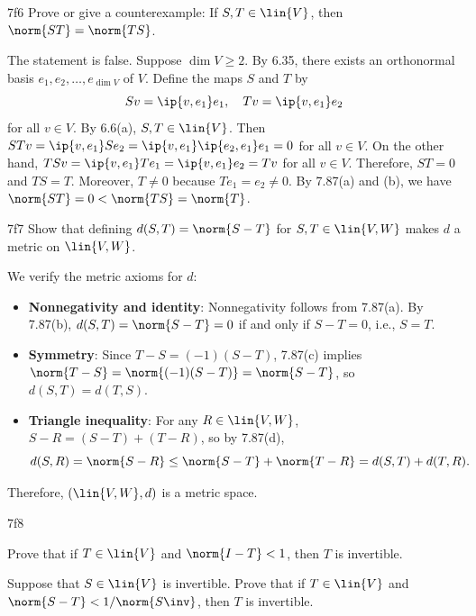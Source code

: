 \begin{exercise}{7f6}
    Prove or give a counterexample: If $S, T \in \lin{V}$, then $\norm{ST} = \norm{TS}$.
\end{exercise}

\begin{sol}
    The statement is false.
    Suppose $\dim V \geq 2$.
    By 6.35, there exists an orthonormal basis $e_1, e_2, \dots, e_{\dim V}$ of $V$.
    Define the maps $S$ and $T$ by
    \[
        S v = \ip{v, e_1} e_1, \quad T v = \ip{v, e_1} e_2
    \]
    for all $v \in V$.
    By 6.6(a), $S, T \in \lin{V}$.
    Then $ST v = \ip{v, e_1} S e_2 = \ip{v, e_1} \ip{e_2, e_1} e_1 = 0$ for all $v \in V$.
    On the other hand, $TS v = \ip{v, e_1} T e_1 = \ip{v, e_1} e_2 = T v$ for all $v \in V$.
    Therefore, $ST = 0$ and $TS = T$.
    Moreover, $T \neq 0$ because $T e_1 = e_2 \neq 0$.
    By 7.87(a) and (b), we have $\norm{ST} = 0 < \norm{TS} = \norm{T}$.
\end{sol}

\begin{exercise}{7f7}
    Show that defining $d(S, T) = \norm{S - T}$ for $S, T \in \lin{V, W}$ makes $d$ a metric on $\lin{V, W}$.

\end{exercise}

\begin{sol}
    We verify the metric axioms for $d$:
    \begin{itemize}
        \item \textbf{Nonnegativity and identity}: Nonnegativity follows from 7.87(a).
        By 7.87(b), $d(S, T) = \norm{S - T} = 0$ if and only if $S - T = 0$, i.e., $S = T$.
        \item \textbf{Symmetry}: Since $T - S = (-1)(S - T)$, 7.87(c) implies $\norm{T - S} = \norm{(-1)(S - T)} = \norm{S - T}$, so $d(S, T) = d(T, S)$.
        \item \textbf{Triangle inequality}: For any $R \in \lin{V, W}$, $S - R = (S - T) + (T - R)$, so by 7.87(d),
        \[
            d(S, R) = \norm{S - R} \leq \norm{S - T} + \norm{T - R} = d(S, T) + d(T, R).
        \]
    \end{itemize}
    Therefore, $(\lin{V, W}, d)$ is a metric space.
\end{sol}

\begin{exercise}{7f8}
    \begin{subexercises}
        \item Prove that if $T \in \lin{V}$ and $\norm{I - T} < 1$, then $T$ is invertible.
        \item Suppose that $S \in \lin{V}$ is invertible.
        Prove that if $T \in \lin{V}$ and $\norm{S - T} < 1/\norm{S\inv}$, then $T$ is invertible.
    \end{subexercises}

\end{exercise}


